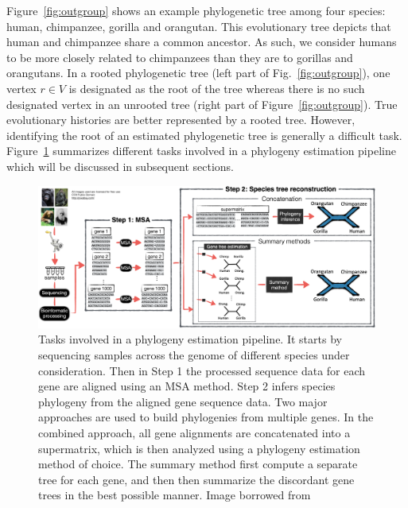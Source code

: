 Figure~\ref{fig:outgroup} shows an example phylogenetic tree among four species: human, chimpanzee, gorilla and orangutan. This evolutionary tree depicts that human and chimpanzee share a common ancestor. As such, we consider humans to be more closely related to chimpanzees than they are to gorillas and orangutans.
In a rooted phylogenetic tree (left part of Fig.~\ref{fig:outgroup}), one vertex $r \in V$ is designated as the root of the tree whereas there is no such designated vertex in an unrooted tree (right part of Figure~\ref{fig:outgroup}). True evolutionary histories are better represented by a rooted tree. However, identifying the root of an estimated phylogenetic tree is generally a difficult task. Figure~\ref{fig:phy-pipeline} summarizes different tasks involved in a phylogeny estimation pipeline which will be discussed in subsequent sections.

\begin{figure}[!htbp]
	\centering
	\includegraphics[width=1.0\textwidth]{Figure/phy-pipeline}
	\caption[Tasks involved in a phylogeny estimation pipeline.]{Tasks involved in a phylogeny estimation pipeline. It starts by sequencing samples across the genome of different species under consideration. Then in Step 1 the processed sequence data for each gene are
aligned using an MSA method. Step 2 infers
		species phylogeny from the aligned gene sequence data. Two major approaches are used to
build phylogenies from multiple genes. In the combined approach, all gene alignments are
concatenated into a supermatrix, which is then analyzed using a phylogeny estimation method of choice. The summary method first compute a separate tree for each gene, and then then summarize the discordant gene trees in the best possible manner. Image borrowed from~\cite{mirarab2015novel}}
	\label{fig:phy-pipeline}
	
\end{figure}

